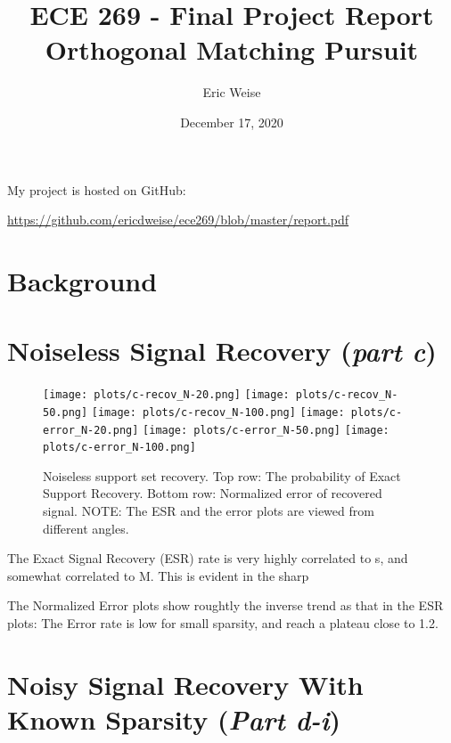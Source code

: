 \documentclass{article}
\title{ECE 269 - Final Project Report\\Orthogonal Matching Pursuit}
\author{Eric Weise}
\date{December 17, 2020}
\begin{document}
\maketitle

My project is hosted on GitHub:

\url{https://github.com/ericdweise/ece269/blob/master/report.pdf}




\section*{Background}




\newpage

\section*{Noiseless Signal Recovery ({\it part c})}


\begin{figure}[h]
    \captionsetup{width=.75\linewidth}
    \centering
        \texttt{[image: plots/c-recov\_N-20.png]}
        \texttt{[image: plots/c-recov\_N-50.png]}
        \texttt{[image: plots/c-recov\_N-100.png]}
        \newline
        \texttt{[image: plots/c-error\_N-20.png]}
        \texttt{[image: plots/c-error\_N-50.png]}
        \texttt{[image: plots/c-error\_N-100.png]}
        \caption{Noiseless support set recovery. Top row: The probability of Exact Support Recovery. Bottom row: Normalized error of recovered signal. NOTE: The ESR and the error plots are viewed from different angles.}
\end{figure}

The Exact Signal Recovery (ESR) rate is very highly correlated to s, and somewhat correlated to M.
This is evident in the sharp 

The Normalized Error plots show roughtly the inverse trend as that in the ESR plots:
The Error rate is low for small sparsity, and reach a plateau close to 1.2.




\newpage
\section*{Noisy Signal Recovery With Known Sparsity ({\it Part d-i})}
\end{document}
